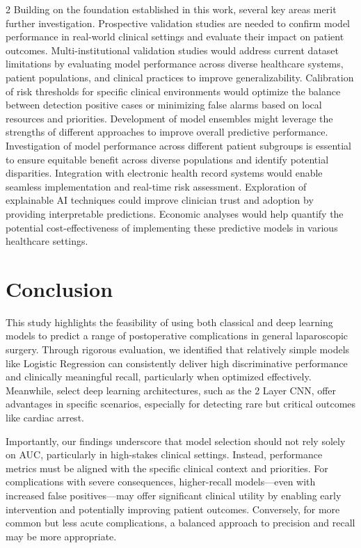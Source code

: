 \documentclass[bst/sn-nature]{sn-jnl}
\begin{document}
\begin{multicols}{2}
\quad Building on the foundation established in this work, several key areas merit further investigation. Prospective validation studies are needed to confirm model performance in real-world clinical settings and evaluate their impact on patient outcomes. Multi-institutional validation studies would address current dataset limitations by evaluating model performance across diverse healthcare systems, patient populations, and clinical practices to improve generalizability. Calibration of risk thresholds for specific clinical environments would optimize the balance between detection positive cases or minimizing false alarms based on local resources and priorities. Development of model ensembles might leverage the strengths of different approaches to improve overall predictive performance. Investigation of model performance across different patient subgroups is essential to ensure equitable benefit across diverse populations and identify potential disparities. Integration with electronic health record systems would enable seamless implementation and real-time risk assessment. Exploration of explainable AI techniques could improve clinician trust and adoption by providing interpretable predictions. Economic analyses would help quantify the potential cost-effectiveness of implementing these predictive models in various healthcare settings.

\section{Conclusion}

\quad This study highlights the feasibility of using both classical and deep learning models to predict a range of postoperative complications in general laparoscopic surgery. Through rigorous evaluation, we identified that relatively simple models like Logistic Regression can consistently deliver high discriminative performance and clinically meaningful recall, particularly when optimized effectively. Meanwhile, select deep learning architectures, such as the 2 Layer CNN, offer advantages in specific scenarios, especially for detecting rare but critical outcomes like cardiac arrest.

Importantly, our findings underscore that model selection should not rely solely on AUC, particularly in high-stakes clinical settings. Instead, performance metrics must be aligned with the specific clinical context and priorities. For complications with severe consequences, higher-recall models—even with increased false positives—may offer significant clinical utility by enabling early intervention and potentially improving patient outcomes. Conversely, for more common but less acute complications, a balanced approach to precision and recall may be more appropriate.


\end{multicols}
\end{document}
